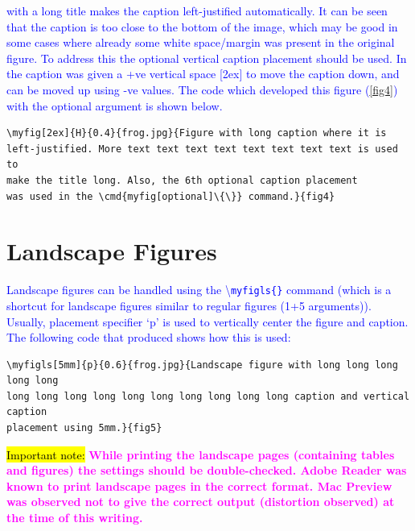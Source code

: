\documentclass[phd,showgrids]{ndsu-thesis-2022}
\newcommand\italk[1]{\textcolor{blue}{#1}}  %
\newcommand\cmd[1]{\textbackslash\texttt{#1}}  %
\begin{document}

\italk{ with a long title makes the caption left-justified automatically. It can be seen that the caption is too close to the bottom of the image, which may be good in some cases where already some white space/margin was present in the original figure. To address this the optional vertical caption placement should be used. In \Cref{fig4} the caption was given a +ve vertical space [2ex] to move the caption down, and can be moved up using -ve values. The code which developed this figure (\cref{fig4}) with the optional argument is shown below.
}

{\singlespacing
\begin{verbatim}
\myfig[2ex]{H}{0.4}{frog.jpg}{Figure with long caption where it is 
left-justified. More text text text text text text text text is used to 
make the title long. Also, the 6th optional caption placement 
was used in the \cmd{myfig[optional]\{\}} command.}{fig4}
\end{verbatim}
}


\section{Landscape Figures}

\italk{Landscape figures can be handled using the \cmd{myfigls\{\}} command (which is a shortcut for landscape figures similar to regular figures (1+5 arguments)). Usually, placement specifier `p' is used to vertically center the figure and caption. The following code that produced \Cref{fig5} shows how this is used:}

\vspace{-4ex}
{\singlespace
\begin{verbatim}
\myfigls[5mm]{p}{0.6}{frog.jpg}{Landscape figure with long long long long long
long long long long long long long long long long caption and vertical caption
placement using 5mm.}{fig5}
\end{verbatim}
}

\italk{\hl{Important note:}} \textcolor{magenta}{\bfseries While printing the landscape pages (containing tables and figures) the settings should be double-checked. Adobe Reader was known to print landscape pages in the correct format. Mac Preview was observed not to give the correct output (distortion observed) at the time of this writing.}
\end{document}
